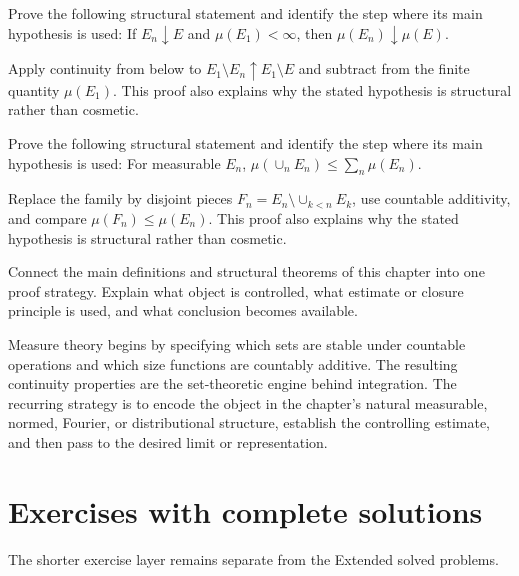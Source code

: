 \begin{problem}\label{prob:iii01-problem-10}
Prove the following structural statement and identify the step where its main hypothesis is used: If $E_n\downarrow E$ and $\mu(E_1)<\infty$, then $\mu(E_n)\downarrow\mu(E)$.
\end{problem}
\begin{solution}
Apply continuity from below to $E_1\setminus E_n\uparrow E_1\setminus E$ and subtract from the finite quantity $\mu(E_1)$. This proof also explains why the stated hypothesis is structural rather than cosmetic.
\end{solution}

\begin{problem}\label{prob:iii01-problem-11}
Prove the following structural statement and identify the step where its main hypothesis is used: For measurable $E_n$, $\mu(\cup_nE_n)\le\sum_n\mu(E_n)$.
\end{problem}
\begin{solution}
Replace the family by disjoint pieces $F_n=E_n\setminus\cup_{k<n}E_k$, use countable additivity, and compare $\mu(F_n)\le\mu(E_n)$. This proof also explains why the stated hypothesis is structural rather than cosmetic.
\end{solution}

\begin{problem}\label{prob:iii01-problem-12}
Connect the main definitions and structural theorems of this chapter into one proof strategy. Explain what object is controlled, what estimate or closure principle is used, and what conclusion becomes available.
\end{problem}
\begin{solution}
Measure theory begins by specifying which sets are stable under countable operations and which size functions are countably additive. The resulting continuity properties are the set-theoretic engine behind integration. The recurring strategy is to encode the object in the chapter's natural measurable, normed, Fourier, or distributional structure, establish the controlling estimate, and then pass to the desired limit or representation.
\end{solution}
\section{Exercises with complete solutions}
The shorter exercise layer remains separate from the Extended solved problems.

